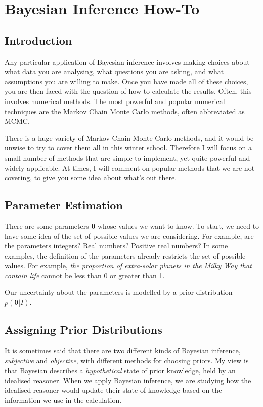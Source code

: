 \newcommand{\btheta}{\boldsymbol{\theta}}

\author[Lecturer1]{Brendon J. Brewer\\
Department of Statistics, The University of Auckland}

\chapter{Bayesian Inference How-To}

\section{Introduction}


Any particular application of Bayesian inference involves making choices
about what data you are analysing, what questions you are
asking, and what assumptions you are willing to make. Once you have made all
of these choices, you are then faced with the question of how to calculate the
results. Often, this involves numerical methods. The most powerful and
popular numerical techniques are the Markov Chain Monte Carlo methods, often
abbreviated as MCMC.

There is a huge variety of Markov Chain Monte Carlo methods, and it would be
unwise to try to cover them all in this winter school. Therefore I will focus
on a small number of methods that are simple to implement, yet quite powerful
and widely applicable. At times, I will comment on popular methods that we are
not covering, to give you some idea about what's out there.



\section{Parameter Estimation}

There are some parameters $\btheta$ whose values we want to know. To start, we
need to have some idea of the set of possible values we are considering. For
example, are the parameters integers? Real numbers? Positive real numbers?
In some examples, the definition of the parameters already restricts the set
of possible values. For example, {\it the proportion of extra-solar planets in
the Milky Way that contain life} cannot be less than 0 or greater than 1.

Our uncertainty about the parameters is modelled by a prior distribution
$p(\btheta | I)$.


\section{Assigning Prior Distributions}
It is sometimes said that there are two different kinds of Bayesian inference,
{\it subjective} and {\it objective}, with different methods for choosing
priors. My view is that Bayesian describes a {\it hypothetical}
state of prior knowledge, held by an idealised reasoner. When we apply
Bayesian inference, we are studying how the idealised reasoner would update
their state of knowledge based on the information we use in the calculation.

